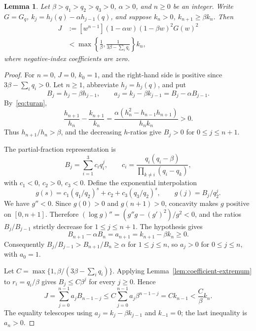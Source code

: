 \documentclass[11pt]{article}
\numberwithin{equation}{section}
\newtheorem{lemma}[theorem]{Lemma}
\begin{document}
\begin{lemma}\label{lem:comparison}
Let $\beta>q_1>q_2>q_3>0$, $\alpha>0$, and $n\ge0$ be an integer.
Write $G=G_q$, $k_j=h_j(q)-\alpha h_{j-1}(q)$, and suppose
$k_n>0$, $k_{n+1}\ge\beta k_n$. Then
\begin{equation}\label{eq:coefficient}
\begin{aligned}
 J&:=[w^{n-1}](1-\alpha w)(1-\beta w)^2G(w)^2\\
  &<\max\left\{\frac1\beta,\frac1{3\beta-\sum_iq_i}\right\}k_n,
\end{aligned}
\end{equation}
where negative-index coefficients are zero.
\end{lemma}
\begin{proof}
For $n=0$, $J=0$, $k_0=1$, and the right-hand side is positive since
$3\beta-\sum_iq_i>0$. Let $n\ge1$, abbreviate $h_j=h_j(q)$, and put
\[
 B_j=h_j-\beta h_{j-1},\qquad
 a_j=k_j-\beta k_{j-1}=B_j-\alpha B_{j-1}.
\]
By~\eqref{eq:turan},
\[
 \frac{h_{n+1}}{h_n}-\frac{k_{n+1}}{k_n}
 =\frac{\alpha(h_n^2-h_{n-1}h_{n+1})}{h_nk_n}>0.
\]
Thus $h_{n+1}/h_n>\beta$, and the decreasing $h$-ratios give
$B_j>0$ for $0\le j\le n+1$.

The partial-fraction representation is
\[
 B_j=\sum_{i=1}^3c_iq_i^j,\qquad
 c_i=\frac{q_i(q_i-\beta)}{\prod_{k\ne i}(q_i-q_k)},
\]
with $c_1<0$, $c_2>0$, $c_3<0$. Define the exponential interpolation
\[
 g(s)=c_1(q_1/q_2)^s+c_2+c_3(q_3/q_2)^s,
 \qquad g(j)=B_j/q_2^j.
\]
We have $g''<0$. Since $g(0)>0$ and $g(n+1)>0$, concavity makes $g$
positive on $[0,n+1]$. Therefore
$(\log g)''=(g''g-(g')^2)/g^2<0$, and the ratios $B_j/B_{j-1}$ strictly
decrease for $1\le j\le n+1$. The hypothesis gives
\[
 B_{n+1}-\alpha B_n=a_{n+1}=k_{n+1}-\beta k_n\ge0.
\]
Consequently $B_j/B_{j-1}>B_{n+1}/B_n\ge\alpha$ for $1\le j\le n$,
so $a_j>0$ for $0\le j\le n$, with $a_0=1$.

Let $C=\max\{1,\beta/(3\beta-\sum_iq_i)\}$. Applying
Lemma~\ref{lem:coefficient-extremum} to $r_i=q_i/\beta$ gives
$B_j\le C\beta^j$ for every $j\ge0$. Hence
\[
 J=\sum_{j=0}^{n-1}a_jB_{n-1-j}
 \le C\sum_{j=0}^{n-1}a_j\beta^{n-1-j}
 =Ck_{n-1}<\frac C\beta k_n.
\]
The equality telescopes using $a_j=k_j-\beta k_{j-1}$ and $k_{-1}=0$;
the last inequality is $a_n>0$.
\end{proof}
\end{document}

